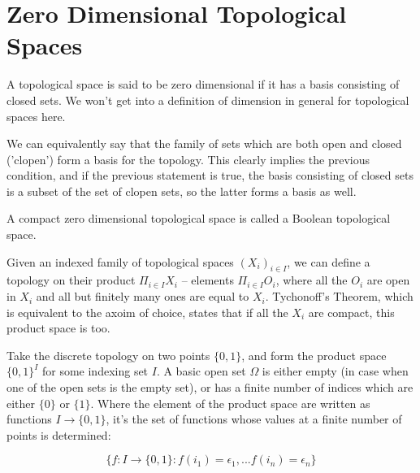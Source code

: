 \documentclass{article}
\begin{document}
%





    \section{Zero Dimensional Topological Spaces}

        A topological space is said to be zero dimensional if it has a basis
        consisting of closed sets. We won't get into a definition of dimension
        in general for topological spaces here.

        We can equivalently say that the family of sets which are both open and
        closed ('clopen') form a basis for the topology. This clearly implies
        the previous condition, and if the previous statement is true, the basis
        consisting of closed sets is a subset of the set of clopen sets, so the
        latter forms a basis as well.

        A compact zero dimensional topological space is called a Boolean
        topological space.

        Given an indexed family of topological spaces $(X_i)_{i \in I}$, we can
        define a topology on their product $\Pi_{i \in I} X_i$ -- elements
        $\Pi_{i \in I} O_i$, where all the $O_i$ are open in $X_i$ and all but
        finitely many ones are equal to $X_i$. Tychonoff's Theorem, which is
        equivalent to the axoim of choice, states that if all the $X_i$ are
        compact, this product space is too.

        Take the discrete topology on two points $\{0,1\}$,
        and form the product space $\{0,1\}^I$ for some indexing set $I$. A
        basic open set $\Omega$ is either empty (in case when one of the open
        sets is the empty set), or has a finite number of indices which are
        either $\{0\}$ or $\{1\}$. Where the element  of the product space are
        written as functions $I \rightarrow \{0,1\}$, it's the set of
        functions whose values at a finite number of points is determined:

        \[\{f: I \rightarrow \{0,1\}: f(i_1) = \epsilon_1, ... f(i_n) =
        \epsilon_n\}\]
\end{document}
